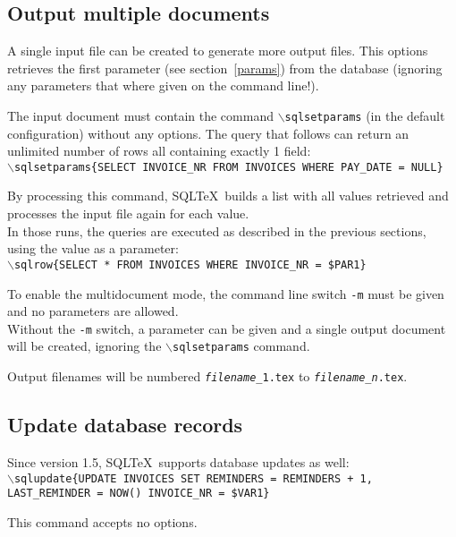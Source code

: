 \documentclass{article}
\newcommand{\bs}{\ensuremath{\backslash}}
\newcommand{\vs}{\vspace{3mm}}
\begin{document}
\subsection{Output multiple documents}\label{multidoc}

A single input file can be created to generate more output files. This options
retrieves the first parameter (see section~\ref{params}) from the database
(ignoring any parameters that where given on the command line!).

\vs

The input document must contain the command \texttt{\bs sqlsetparams} (in the
default configuration) without any options. The query that follows can return an
unlimited number of rows all containing exactly 1 field: \\
\texttt{\bs sqlsetparams\{SELECT INVOICE\_NR FROM INVOICES WHERE PAY\_DATE = NULL\}}

\vs

By processing this command, SQL\TeX\ builds a list with all values retrieved and
processes the input file again for each value.\\
In those runs, the queries are executed as described in the previous sections,
using the value as a parameter:\\
\texttt{\bs sqlrow\{SELECT * FROM INVOICES WHERE INVOICE\_NR = \$PAR1\}}

\vs

To enable the multidocument mode, the command line switch \texttt{-m} must be
given and no parameters are allowed.\\
Without the \texttt{-m} switch, a parameter can be given and a single output
document will be created, ignoring the \texttt{\bs sqlsetparams} command.

\vs

Output filenames will be numbered \texttt{\emph{filename}\_1.tex} to \texttt{\emph{filename}\_\emph{n}.tex}.

\subsection{Update database records}

Since version 1.5, SQL\TeX\ supports database updates as well: \\
\texttt{\bs sqlupdate\{UPDATE INVOICES SET REMINDERS = REMINDERS + 1,
LAST\_REMINDER = NOW() INVOICE\_NR = \$VAR1\}}

\vs

This command accepts no options.
\end{document}
